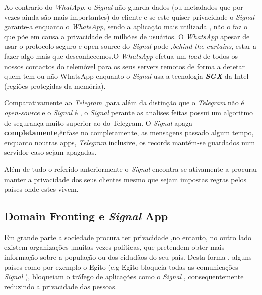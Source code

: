 Ao contrario do \textit{WhatApp}, o \textit{Signal} não guarda dados (ou metadados que por vezes ainda são mais importantes) do cliente e se este quiser privacidade o \textit{Signal} garante-a enquanto o \textit{WhatsApp}, sendo a aplicação mais utilizada , não o faz o que põe em causa a privacidade de milhões de usuários. O \textit{WhatsApp} apesar de usar o protocolo seguro e open-source do \textit{Signal} pode ,\textit{behind the curtains}, estar a fazer algo mais que desconhecemos.O \textit{WhatsApp} efetua um \textit{load} de todos os nossos contactos do telemóvel para os seus servers remotos de forma a detetar quem tem ou não WhatsApp enquanto o \textit{Signal} usa a tecnologia \textit{\textbf{SGX}} da Intel (regiões protegidas da memória). 

Comparativamente ao \textit{Telegram} ,para além da distinção que o \textit{Telegram} não é \textit{open-source} e o \textit{Signal} é , o \textit{Signal} perante as analises feitas possui um algoritmo de segurança muito superior ao do Telegram.
O \textit{Signal} apaga \textbf{completamente},ênfase no completamente, as mensagens passado algum tempo, enquanto noutras apps, \textit{Telegram} inclusive, os records mantém-se guardados num servidor caso sejam apagadas.

Além de tudo o referido anteriormente o \textit{Signal} encontra-se ativamente a procurar manter a privacidade dos seus clientes mesmo que sejam impostas regras pelos países onde estes vivem.

\subsection{Domain Fronting e \textit{Signal} App}
Em grande parte a sociedade procura ter privacidade ,no entanto, no outro lado existem organizações ,muitas vezes políticas, que pretendem obter mais informação sobre a população ou dos cidadãos do seu pais. Desta forma , alguns países como por exemplo o Egito (e.g Egito bloqueia todas as comunicações \textit{Signal} \cite{noSignal}), bloqueiam o tráfego de aplicações como o \textit{Signal} , consequentemente reduzindo a privacidade das pessoas.

